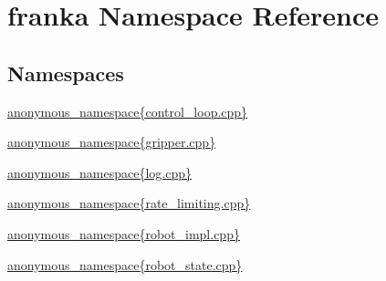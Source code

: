 \hypertarget{namespacefranka}{}\section{franka Namespace Reference}
\label{namespacefranka}
\subsection*{Namespaces}
\begin{DoxyCompactItemize}
\item 
 \hyperlink{namespacefranka_1_1anonymous__namespace_02control__loop_8cpp_03}{anonymous\+\_\+namespace\{control\+\_\+loop.\+cpp\}}
\item 
 \hyperlink{namespacefranka_1_1anonymous__namespace_02gripper_8cpp_03}{anonymous\+\_\+namespace\{gripper.\+cpp\}}
\item 
 \hyperlink{namespacefranka_1_1anonymous__namespace_02log_8cpp_03}{anonymous\+\_\+namespace\{log.\+cpp\}}
\item 
 \hyperlink{namespacefranka_1_1anonymous__namespace_02rate__limiting_8cpp_03}{anonymous\+\_\+namespace\{rate\+\_\+limiting.\+cpp\}}
\item 
 \hyperlink{namespacefranka_1_1anonymous__namespace_02robot__impl_8cpp_03}{anonymous\+\_\+namespace\{robot\+\_\+impl.\+cpp\}}
\item 
 \hyperlink{namespacefranka_1_1anonymous__namespace_02robot__state_8cpp_03}{anonymous\+\_\+namespace\{robot\+\_\+state.\+cpp\}}
\end{DoxyCompactItemize}
